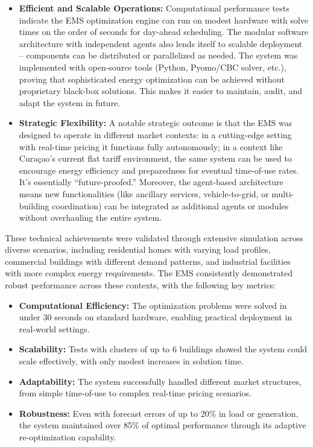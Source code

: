 \documentclass[12pt,a4paper]{article}
\begin{document}
\begin{itemize}
    \item \textbf{Efficient and Scalable Operations:} Computational performance tests indicate the EMS optimization engine can run on modest hardware with solve times on the order of seconds for day-ahead scheduling. The modular software architecture with independent agents also lends itself to scalable deployment – components can be distributed or parallelized as needed. The system was implemented with open-source tools (Python, Pyomo/CBC solver, etc.), proving that sophisticated energy optimization can be achieved without proprietary black-box solutions. This makes it easier to maintain, audit, and adapt the system in future.
    \item \textbf{Strategic Flexibility:} A notable strategic outcome is that the EMS was designed to operate in different market contexts: in a cutting-edge setting with real-time pricing it functions fully autonomously; in a context like Curaçao’s current flat tariff environment, the same system can be used to encourage energy efficiency and preparedness for eventual time-of-use rates. It’s essentially “future-proofed.” Moreover, the agent-based architecture means new functionalities (like ancillary services, vehicle-to-grid, or multi-building coordination) can be integrated as additional agents or modules without overhauling the entire system.
\end{itemize}
These technical achievements were validated through extensive simulation across diverse scenarios, including residential homes with varying load profiles, commercial buildings with different demand patterns, and industrial facilities with more complex energy requirements. The EMS consistently demonstrated robust performance across these contexts, with the following key metrics:

\begin{itemize}
    \item \textbf{Computational Efficiency:} The optimization problems were solved in under 30 seconds on standard hardware, enabling practical deployment in real-world settings.
    \item \textbf{Scalability:} Tests with clusters of up to 6 buildings showed the system could scale effectively, with only modest increases in solution time.
    \item \textbf{Adaptability:} The system successfully handled different market structures, from simple time-of-use to complex real-time pricing scenarios.
    \item \textbf{Robustness:} Even with forecast errors of up to 20\% in load or generation, the system maintained over 85\% of optimal performance through its adaptive re-optimization capability.
\end{itemize}
\end{document}
